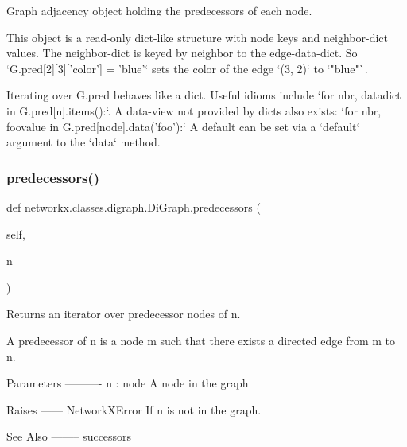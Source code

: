 \begin{DoxyVerb}Graph adjacency object holding the predecessors of each node.

This object is a read-only dict-like structure with node keys
and neighbor-dict values.  The neighbor-dict is keyed by neighbor
to the edge-data-dict.  So `G.pred[2][3]['color'] = 'blue'` sets
the color of the edge `(3, 2)` to `"blue"`.

Iterating over G.pred behaves like a dict. Useful idioms include
`for nbr, datadict in G.pred[n].items():`.  A data-view not provided
by dicts also exists: `for nbr, foovalue in G.pred[node].data('foo'):`
A default can be set via a `default` argument to the `data` method.
\end{DoxyVerb}
 \mbox{\label{classnetworkx_1_1classes_1_1digraph_1_1DiGraph_a6e32545530bc78e88c135642983c0205}} 
\subsubsection{\texorpdfstring{predecessors()}{predecessors()}}
{\footnotesize\ttfamily def networkx.\+classes.\+digraph.\+Di\+Graph.\+predecessors (\begin{DoxyParamCaption}\item[{}]{self,  }\item[{}]{n }\end{DoxyParamCaption})}

\begin{DoxyVerb}Returns an iterator over predecessor nodes of n.

A predecessor of n is a node m such that there exists a directed
edge from m to n.

Parameters
----------
n : node
   A node in the graph

Raises
------
NetworkXError
   If n is not in the graph.

See Also
--------
successors
\end{DoxyVerb}
 \mbox{\label{classnetworkx_1_1classes_1_1digraph_1_1DiGraph_a4a83f58a73325d6466293ad127842daa}} 
